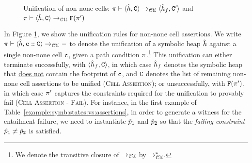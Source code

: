 \begin{figure}[!t]
{\scriptsize
{}}
\vspace*{-0.5cm}
\caption{Unification of non-none cells: $\pi \vdash \langle \hat{h}, \mathtt{C} \rangle \rightarrow_{\cal CU} \langle \hat{h}_f, \mathtt{C}' \rangle$
and $\pi \vdash \langle \hat{h}, \mathtt{C} \rangle \rightarrow_{\cal CU} {\mathtt{F}}(\pi')$}
\label{fig:uninonnone}
\vspace*{-0.2cm}
\end{figure}


In Figure \ref{fig:uninonnone}, we show the unification rules for non-none cell assertions. 
We write $\pi \vdash \langle \hat{h}, \mathtt{c} :: \mathtt{C} \rangle \rightarrow_{\cal CU} -$ to denote the unification of a symbolic heap $\hat{h}$ against a single non-none cell $\mathtt{c}$, given a path condition $\pi$.\footnote{We denote the transitive closure of $\rightarrow_{\cal CU}$ by $\rightarrow_{\cal CU}^*$.}  This unification can either terminate
successfully, with $\langle \hat{h}_f, \mathtt{C} \rangle$, in which case $\hat{h}_f$ denotes the
symbolic heap %
that \underline{does not} contain the footprint of $\mathtt{c}$, 
 and $\mathtt{C}$ denotes the list of remaining non-none cell assertions to be unified (\textsc{Cell Assertion}); or unsuccessfully, with ${\mathtt{F}}(\pi')$, 
in which case $\pi'$ captures the constraints required for the unification to provably fail (\textsc{Cell Assertion - Fail}).
For instance, in the first example of Table~\ref{example:symb:states:vs:assertions}, 
in order to generate a witness for the entailment failure, we need to instantiate $\hat{p}_1$ and $\hat{p}_2$ so that the \emph{failing constraint} $\hat{p}_1 \neq \hat{p}_2$ is satisfied. 

